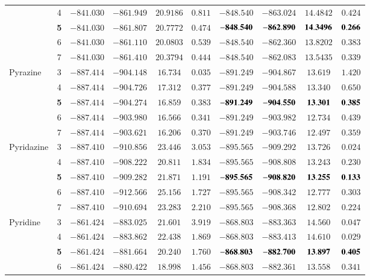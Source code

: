 \documentclass[aip,jcp,reprint,noshowkeys,superscriptaddress,floatfix]{revtex4-1}
\begin{document}
\begin{squeezetable}
\begin{table*}
\begin{ruledtabular}
\begin{tabular}{lccccccccc}
					&	4	&	$-841.030$	&	$-861.949$	&	$20.9186$	&	$0.811$	&	$-848.540$	&	$-863.024$	&	$14.4842$	&	$0.424$		\\
					&\bf5	&	$-841.030$	&	$-861.807$	&	$20.7772$	&	$0.474$	&$\bf-848.540$	&$\bf-862.890$	&$\bf14.3496$	&$\bf0.266$		\\
					&	6	&	$-841.030$	&	$-861.110$	&	$20.0803$	&	$0.539$	&	$-848.540$	&	$-862.360$	&	$13.8202$	&	$0.383$		\\
					&	7	&	$-841.030$	&	$-861.410$	&	$20.3794$	&	$0.444$	&	$-848.540$	&	$-862.083$	&	$13.5435$	&	$0.339$		\\
	\hline
	Pyrazine		&	3	&	$-887.414$	&	$-904.148$	&	$16.734$	&	$0.035$	&	$-891.249$	&	$-904.867$	&	$13.619$	&	$1.420$		\\
					&	4	&	$-887.414$	&	$-904.726$	&	$17.312$	&	$0.377$	&	$-891.249$	&	$-904.588$	&	$13.340$	&	$0.650$		\\
					&\bf5	&	$-887.414$	&	$-904.274$	&	$16.859$	&	$0.383$	&$\bf-891.249$	&$\bf-904.550$	&$\bf13.301$	&$\bf0.385$		\\
					&	6	&	$-887.414$	&	$-903.980$	&	$16.566$	&	$0.341$	&	$-891.249$	&	$-903.982$	&	$12.734$	&	$0.439$		\\
					&	7	&	$-887.414$	&	$-903.621$	&	$16.206$	&	$0.370$	&	$-891.249$	&	$-903.746$	&	$12.497$	&	$0.359$		\\
	\hline
	Pyridazine		&	3	&	$-887.410$	&	$-910.856$	&	$23.446$	&	$3.053$	&	$-895.565$	&	$-909.292$	&	$13.726$	&	$0.024$		\\
					&	4	&	$-887.410$	&	$-908.222$	&	$20.811$	&	$1.834$	&	$-895.565$	&	$-908.808$	&	$13.243$	&	$0.230$		\\
					&\bf5	&	$-887.410$	&	$-909.282$	&	$21.871$	&	$1.191$	&$\bf-895.565$	&$\bf-908.820$	&$\bf13.255$	&$\bf0.133$		\\
					&	6	&	$-887.410$	&	$-912.566$	&	$25.156$	&	$1.727$	&	$-895.565$	&	$-908.342$	&	$12.777$	&	$0.303$		\\
					&	7	&	$-887.410$	&	$-910.694$	&	$23.283$	&	$2.210$	&	$-895.565$	&	$-908.368$	&	$12.802$	&	$0.224$		\\
	\hline
	Pyridine		&	3	&	$-861.424$	&	$-883.025$	&	$21.601$	&	$3.919$	&	$-868.803$	&	$-883.363$	&	$14.560$	&	$0.047$		\\
					&	4	&	$-861.424$	&	$-883.862$	&	$22.438$	&	$1.869$	&	$-868.803$	&	$-883.413$	&	$14.610$	&	$0.029$		\\
					&\bf5	&	$-861.424$	&	$-881.664$	&	$20.240$	&	$1.760$	&$\bf-868.803$	&$\bf-882.700$	&$\bf13.897$	&$\bf0.405$		\\
					&	6	&	$-861.424$	&	$-880.422$	&	$18.998$	&	$1.456$	&	$-868.803$	&	$-882.361$	&	$13.558$	&	$0.341$		\\

\end{tabular}
\end{ruledtabular}
\end{table*}
\end{squeezetable}
\end{document}
